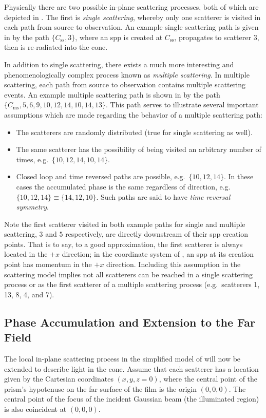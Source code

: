 Physically there are two possible in-plane scattering processes, both of which
are depicted in .  The first is \textit{single
  scattering}, whereby only one scatterer is visited in each path from source to
observation.  An example single scattering path is given in
 by the path $\{C_\mathrm{ss},3\}$, where an \gls{spp}
is created at $C_\mathrm{ss}$, propagates to scatterer $3$, then is
re-radiated into the cone.

In addition to single scattering, there exists a much more interesting and
phenomenologically complex process known as \textit{multiple scattering}.  In
multiple scattering, each path from source to observation contains multiple
scattering events.  An example multiple scattering path is shown
in  by the path
$\{C_\mathrm{ms},5,6,9,10,12,14,10,14,13\}$.  This path serves to illustrate
several important assumptions which are made regarding the behavior of a multiple scattering
path:
\begin{itemize}
  \item The scatterers are randomly distributed (true for single scattering as well).
  \item The same scatterer has the possibility of being visited an arbitrary number of times, e.g.\ $\{10,12,14,10,14\}$.
  \item Closed loop and time reversed paths are possible, e.g.\ $\{10,12,14\}$.  In these cases the accumulated phase is the same regardless of direction, e.g.\ $\{10,12,14\} \equiv \{14,12,10\}$.  Such paths are said to have \textit{time reversal symmetry}.
\end{itemize}

Note the first scatterer visited in both example paths for single and multiple
scattering, $3$ and $5$ respectively, are directly downstream of their \gls{spp}
creation points.  That is to say, to a good approximation, the first scatterer
is always located in the ${+}x$ direction; in the coordinate system of
, an \gls{spp} at its creation point has momentum in
the ${+}x$ direction.  Including this assumption in the scattering model
implies not all scatterers can be reached in a single scattering process or as
the first scatterer of a multiple scattering process (e.g.\ scatterers
1, 13, 8, 4, and 7).

\subsection{Phase Accumulation and Extension to the Far Field}
The local in-plane scattering process in the simplified model of
 will now be extended to describe light in the
cone.  Assume that each scatterer has a location given
by the Cartesian coordinates $(x,y,z=0)$, where the central point of the
prism's hypotenuse on the far surface of the film is the origin
$(0,0,0)$.  The central point of the focus of the incident Gaussian
beam (the illuminated region) is also coincident at $(0,0,0)$.

